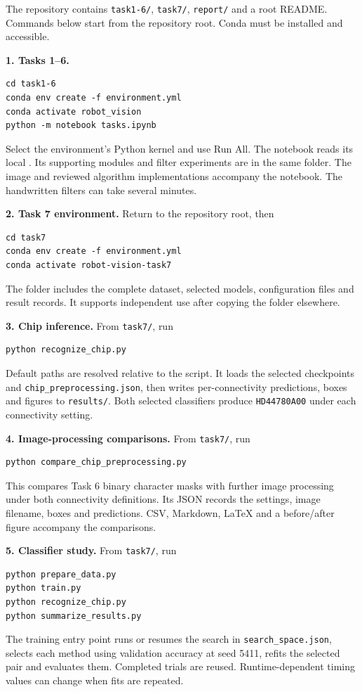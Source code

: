 The repository contains \texttt{task1-6/}, \texttt{task7/}, \texttt{report/} and a root README. Commands below start from the repository root. Conda must be installed and accessible.

\textbf{1. Tasks 1--6.}
\begin{verbatim}
cd task1-6
conda env create -f environment.yml
conda activate robot_vision
python -m notebook tasks.ipynb
\end{verbatim}
Select the environment's Python kernel and use Run All. The notebook reads its local . Its supporting modules and filter experiments are in the same folder. The image and reviewed algorithm implementations accompany the notebook. The handwritten filters can take several minutes.

\textbf{2. Task 7 environment.} Return to the repository root, then
\begin{verbatim}
cd task7
conda env create -f environment.yml
conda activate robot-vision-task7
\end{verbatim}
The folder includes the complete dataset, selected models, configuration files and result records. It supports independent use after copying the folder elsewhere.

\textbf{3. Chip inference.} From \texttt{task7/}, run
\begin{verbatim}
python recognize_chip.py
\end{verbatim}
Default paths are resolved relative to the script. It loads the selected checkpoints and \texttt{chip\_preprocessing.json}, then writes per-connectivity predictions, boxes and figures to \texttt{results/}. Both selected classifiers produce \texttt{HD44780A00} under each connectivity setting.

\textbf{4. Image-processing comparisons.} From \texttt{task7/}, run
\begin{verbatim}
python compare_chip_preprocessing.py
\end{verbatim}
This compares Task 6 binary character masks with further image processing under both connectivity definitions. Its JSON records the settings, image filename, boxes and predictions. CSV, Markdown, LaTeX and a before/after figure accompany the comparisons.

\textbf{5. Classifier study.} From \texttt{task7/}, run
\begin{verbatim}
python prepare_data.py
python train.py
python recognize_chip.py
python summarize_results.py
\end{verbatim}
The training entry point runs or resumes the search in \texttt{search\_space.json}, selects each method using validation accuracy at seed 5411, refits the selected pair and evaluates them. Completed trials are reused. Runtime-dependent timing values can change when fits are repeated.

